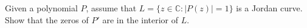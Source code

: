 Given a polynomial $P$, assume that $L = \{z \in \mathbb{C}: |P(z)| = 1\}$ is a Jordan curve. Show that the zeros of $P'$ are in the interior of $L$.
